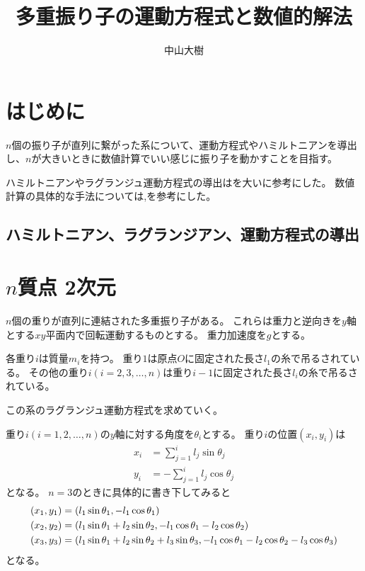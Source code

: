 \documentclass{jsarticle}
\title{多重振り子の運動方程式と数値的解法}
\author{中山大樹}
\newcommand{\eqa}[1]{\begin{align}#1\end{align}}
\begin{document}
\maketitle

\section{はじめに}

$n$個の振り子が直列に繋がった系について、運動方程式やハミルトニアンを導出し、$n$が大きいときに数値計算でいい感じに振り子を動かすことを目指す。

ハミルトニアンやラグランジュ運動方程式の導出は\cite{カオス人形のしくみ}を大いに参考にした。
数値計算の具体的な手法については\cite{システム数理IV},\cite{陰的RUNGE-KUTTA法}を参考にした。

\subsection{ハミルトニアン、ラグランジアン、運動方程式の導出}

\section{$n$質点 2次元}

$n$個の重りが直列に連結された多重振り子がある。
これらは重力と逆向きを$y$軸とする$xy$平面内で回転運動するものとする。
重力加速度を$g$とする。

各重り$i$は質量$m_i$を持つ。
重り$1$は原点$O$に固定された長さ$l_1$の糸で吊るされている。
その他の重り$i(i=2,3,\dots,n)$は重り$i-1$に固定された長さ$l_i$の糸で吊るされている。

この系のラグランジュ運動方程式を求めていく。

重り$i(i=1,2,\dots,n)$の$y$軸に対する角度を$\theta_i$とする。
重り$i$の位置$(x_i, y_i)$は
\eqa{
	x_i &= \sum_{j=1}^i l_j \sin\theta_j \\
	y_i &= -\sum_{j=1}^i l_j \cos\theta_j
}
となる。
$n=3$のときに具体的に書き下してみると
\eqa{
	\left(x_1, y_1\right) &= \left(l_1 \sin\theta_1, -l_1 \cos\theta_1\right) \notag\\
	\left(x_2, y_2\right) &= \left(l_1 \sin\theta_1 + l_2 \sin\theta_2, -l_1 \cos\theta_1 - l_2 \cos\theta_2\right) \notag\\
	\left(x_3, y_3\right) &= \left(
		l_1 \sin\theta_1 + l_2 \sin\theta_2 + l_3 \sin\theta_3,
		-l_1 \cos\theta_1 - l_2 \cos\theta_2 - l_3 \cos\theta_3
		\right) \notag
}
となる。
\end{document}
